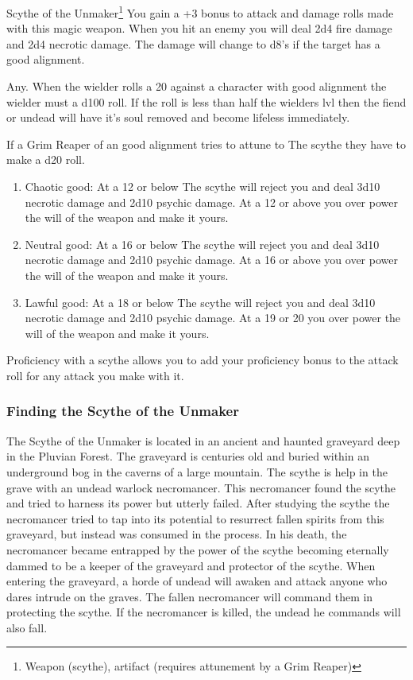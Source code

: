 \begin{commentbox}{Scythe of the Unmaker\footnote{Weapon (scythe), artifact (requires attunement by a Grim Reaper)}}
	You gain a +3 bonus to attack and damage rolls made with this magic weapon. When you hit an enemy you will deal 2d4 fire damage and 2d4 necrotic damage. The damage will change to d8's if the target has a good alignment.
	
	Any. When the wielder rolls a 20 against a character with good alignment the wielder must a d100 roll. If the roll is less than half the wielders lvl then the fiend or undead will have it's soul removed and become lifeless immediately.
	
	If a Grim Reaper of an good alignment tries to attune to The scythe they have to make a d20 roll. 
	\begin{enumerate}
		\item Chaotic good: At a 12 or below The scythe will reject you and deal 3d10 necrotic damage and 2d10 psychic damage. At a 12 or above you over power the will of the weapon and make it yours.
		\item Neutral good: At a 16 or below The scythe will reject you and deal 3d10 necrotic damage and 2d10 psychic damage. At a 16 or above you over power the will of the weapon and make it yours.
		\item Lawful good: At a 18 or below The scythe will reject you and deal 3d10 necrotic damage and 2d10 psychic damage. At a 19 or 20 you over power the will of the weapon and make it yours.
	\end{enumerate}
	
	Proficiency with a scythe allows you to add your proficiency bonus to the attack roll for any attack you make with it.
\end{commentbox}

\subsubsection{Finding the Scythe of the Unmaker}

The Scythe of the Unmaker is located in an ancient and haunted graveyard deep in the Pluvian Forest. The graveyard is centuries old and buried within an underground bog in the caverns of a large mountain. The scythe is help in the grave with an undead warlock necromancer. This necromancer found the scythe and tried to harness its power but utterly failed. After studying the scythe the necromancer tried to tap into its potential to resurrect fallen spirits from this graveyard, but instead was consumed in the process. In his death, the necromancer became entrapped by the power of the scythe becoming eternally dammed to be a keeper of the graveyard and protector of the scythe. When entering the graveyard, a horde of undead will awaken and attack anyone who dares intrude on the graves. The fallen necromancer will command them in protecting the scythe. If the necromancer is killed, the undead he commands will also fall.


